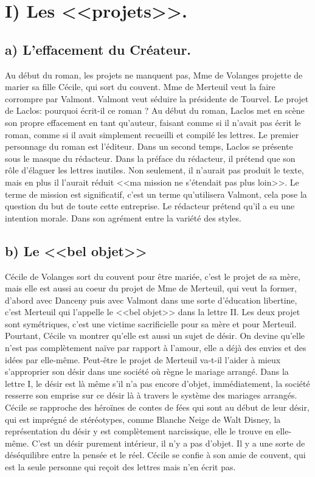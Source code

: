 \documentclass[12pt]{article}
\begin{document}
\section*{\color{red}I) Les <<projets>>.}
\subsection*{a) L'effacement du Créateur.}
Au début du roman, les projets ne manquent pas, Mme de Volanges projette de marier sa fille Cécile, qui sort du couvent.
Mme de Merteuil veut la faire corrompre par Valmont.
Valmont veut séduire la présidente de Tourvel.
Le projet de Laclos: pourquoi écrit-il ce roman ?
Au début du roman, Laclos met en scène son propre effacement en tant qu'auteur, faisant comme si il n'avait pas écrit le roman, comme si il avait simplement recueilli et compilé les lettres.
Le premier personnage du roman est l'éditeur.
Dans un second temps, Laclos se présente sous le masque du rédacteur.
Dans la préface du rédacteur, il prétend que son rôle d'élaguer les lettres inutiles.
Non seulement, il n'aurait pas produit le texte, mais en plus il l'aurait réduit <<ma mission ne s'étendait pas plus loin>>.
Le terme de mission est significatif, c'est un terme qu'utilisera Valmont, cela pose la question du but de toute cette entreprise.
Le rédacteur prétend qu'il a eu une intention morale.
Dans son agrément entre la variété des styles.

\pagebreak
{}
\subsection*{b) Le <<bel objet>>}
Cécile de Volanges sort du couvent pour être mariée, c'est le projet de sa mère, mais elle est aussi au coeur du projet de Mme de Merteuil, qui veut la former, d'abord avec Danceny puis avec Valmont dans une sorte d'éducation libertine, c'est Merteuil qui l'appelle le <<bel objet>> dans la lettre II.
Les deux projet sont symétriques, c'est une victime sacrificielle pour sa mère et pour Merteuil.
Pourtant, Cécile va montrer qu'elle est aussi un sujet de désir. On devine qu'elle n'est pas complètement naïve par rapport à l'amour, elle a déjà des envies et des idées par elle-même.
Peut-être le projet de Merteuil va-t-il l'aider à mieux s'approprier son désir dans une société où règne le mariage arrangé.
Dans la lettre I, le désir est là même s'il n'a pas encore d'objet, immédiatement, la société resserre son emprise sur ce désir là à travers le système des mariages arrangés.
Cécile se rapproche des héroïnes de contes de fées qui sont au début de leur désir, qui est imprégné de stéréotypes, comme Blanche Neige de Walt Disney, la représentation du désir y est complètement narcissique, elle le trouve en elle-même.
C'est un désir purement intérieur, il n'y a pas d'objet. Il y a une sorte de déséquilibre entre la pensée et le réel.
Cécile se confie à son amie de couvent, qui est la seule personne qui reçoit des lettres mais n'en écrit pas.
\end{document}
